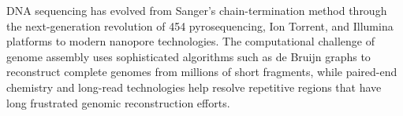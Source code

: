 DNA sequencing has evolved from Sanger's chain-termination method through the next-generation revolution of 454 pyrosequencing, Ion Torrent, and Illumina platforms to modern nanopore technologies. The computational challenge of genome assembly uses sophisticated algorithms such as de Bruijn graphs to reconstruct complete genomes from millions of short fragments, while paired-end chemistry and long-read technologies help resolve repetitive regions that have long frustrated genomic reconstruction efforts.